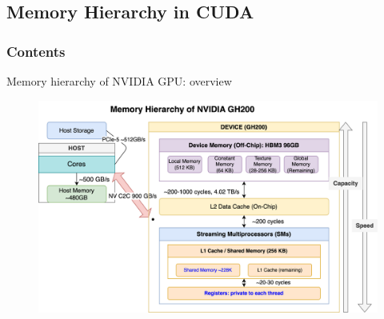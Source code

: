 \documentclass[dvipdfmx, 11pt, aspectratio=169]{beamer}   %
\begin{document}
\subsection{Memory Hierarchy in CUDA}
\begin{frame}
    \frametitle{Contents}
    \linespread{0.6}\selectfont
\end{frame}
\begin{frame}{Memory hierarchy of NVIDIA GPU: overview}
  \begin{figure}
    \includegraphics[scale=0.105]{img/memHierarchy.png}
  \end{figure}
\end{frame}
\end{document}
